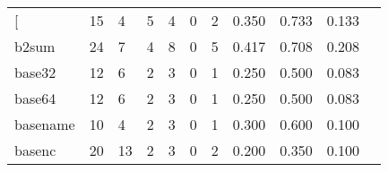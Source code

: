 \begin{longtable}{lp{1.20cm}p{1.20cm}p{1.20cm}p{1.20cm}p{1.20cm}p{1.20cm}p{1.20cm}p{1.20cm}p{1.20cm}p{1.20cm}}
\bottomrule
\endlastfoot
{[}         &                                    15 &                                                  4 &                                                  5 &                                                  4 &                                                  0 &                                                  2 &                                         0.350 &                                              0.733 &                                              0.133 \\
b2sum     &                                    24 &                                                  7 &                                                  4 &                                                  8 &                                                  0 &                                                  5 &                                         0.417 &                                              0.708 &                                              0.208 \\
base32    &                                    12 &                                                  6 &                                                  2 &                                                  3 &                                                  0 &                                                  1 &                                         0.250 &                                              0.500 &                                              0.083 \\
base64    &                                    12 &                                                  6 &                                                  2 &                                                  3 &                                                  0 &                                                  1 &                                         0.250 &                                              0.500 &                                              0.083 \\
basename  &                                    10 &                                                  4 &                                                  2 &                                                  3 &                                                  0 &                                                  1 &                                         0.300 &                                              0.600 &                                              0.100 \\
basenc    &                                    20 &                                                 13 &                                                  2 &                                                  3 &                                                  0 &                                                  2 &                                         0.200 &                                              0.350 &                                              0.100 \\

\end{longtable}
